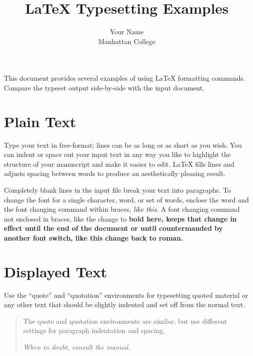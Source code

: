 \documentclass[11pt]{article}
\begin{document}
\title{LaTeX Typesetting Examples}
\author{Your Name\\
Manhattan College}
\renewcommand{\today}{February 5, 2019}
\maketitle
This document provides several examples of using LaTeX formatting commands.
Compare the typeset output side-by-side with the input document.

\begin{figure}[!h]
\end{figure}

\section {Plain Text}
Type your text in free-format; lines can be as long
or as short
as you wish.
        You can indent         or space out
        your input 
            text in 
                any way you like to highlight the structure
        of your manuscript and make it easier to edit.
LaTeX fills lines and adjusts spacing between words to produce an
aesthetically pleasing result.

Completely blank lines in the input file break your text into
paragraphs.
To change the font for a single character, word, or set of words, 
enclose the word and the font changing command within braces, 
{\em like this}.
A font changing command not enclosed in braces, like the change to \bf 
bold here, keeps that change in effect until the end of the document or
until countermanded by another font switch, like this change back to 
\rm roman.

\section {Displayed Text}
Use the ``quote'' and  ``quotation'' environments for typesetting quoted
material or any other text that should be slightly indented and set off
from the normal text.
\begin{quotation}
The quote and quotation environments are similar, but use different 
settings for paragraph indentation and spacing.

\em When in doubt, consult the manual.
\end{quotation}
\end{document}
